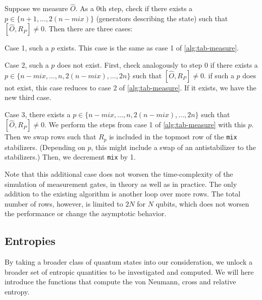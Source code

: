 \begin{alg}\label{alg:sim-meas-mixed}
  Suppose we measure $\hat{O}$. As a $0$th step, check if there exists a $p \in
  \{ n+1, \ldots, 2(n-mix) \}$ (generators describing the state) such that
  $[\hat{O}, R_P] \neq 0$. Then there are three cases:

  Case 1, such a $p$ exists. This case is the same as case 1 of
  \cref{alg:tab-measure}.

  Case 2, such a $p$ does not exist. First, check analogously to step $0$ if
  there exists a $p \in \{n-mix, \ldots, n, 2(n-mix), \ldots, 2n\}$ such that
  $[\hat{O}, R_P] \neq 0$. if such a $p$ does not exist, this case reduces to
  case 2 of \cref{alg:tab-measure}. If it exists, we have the new third case.

  Case 3, there exists a $p \in \{n-mix, \ldots, n, 2(n-mix), \ldots, 2n\}$
  such that $[\hat{O}, R_P] \neq 0$. We perform the steps from case 1 of
  \cref{alg:tab-measure} with this $p$. Then we swap rows such that $R_p$ is
  included in the topmost row of the \verb|mix| stabilizers. (Depending on $p$,
  this might include a swap of an antistabilizer to the stabilizers.) Then, we
  decrement \verb|mix| by 1.
\end{alg}

Note that this additional case does not worsen the time-complexity of the
simulation of measurement gates, in theory as well as in practice. The only
addition to the existing algorithm is another loop over more rows. The total
number of rows, however, is limited to $2N$ for $N$ qubits, which does not
worsen the performance or change the asymptotic behavior.

\subsection{Entropies}\label{sec:sim-entropies}
By taking a broader class of quantum states into our consideration, we unlock a
broader set of entropic quantities to be investigated and computed. We will
here introduce the functions that compute the von Neumann, cross and relative
entropy.
